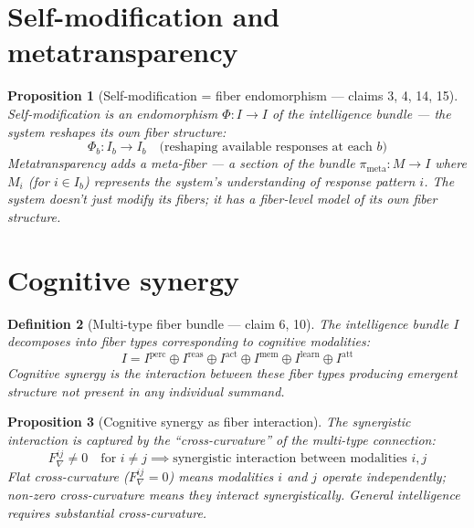 \documentclass[11pt,a4paper]{article}
\newtheorem{definition}{Definition}[section]
\newtheorem{proposition}[definition]{Proposition}
\begin{document}
\section{Self-modification and metatransparency}

\begin{proposition}[Self-modification = fiber endomorphism --- claims 3, 4, 14, 15]
\label{prop:selfmod}
Self-modification is an endomorphism $\Phi: I \to I$ of the intelligence
bundle --- the system reshapes its own fiber structure:
\[
  \Phi_b : I_b \to I_b \quad \text{(reshaping available responses at each } b\text{)}
\]
Metatransparency adds a \emph{meta-fiber} --- a section of the bundle
$\pi_{\text{meta}} : M \to I$ where $M_i$ (for $i \in I_b$) represents
the system's understanding of response pattern $i$. The system doesn't
just modify its fibers; it has a fiber-level model of its own fiber structure.
\end{proposition}

\section{Cognitive synergy}

\begin{definition}[Multi-type fiber bundle --- claim 6, 10]
The intelligence bundle $I$ decomposes into fiber types corresponding to
cognitive modalities:
\[
  I = I^{\text{perc}} \oplus I^{\text{reas}} \oplus I^{\text{act}}
    \oplus I^{\text{mem}} \oplus I^{\text{learn}} \oplus I^{\text{att}}
\]
Cognitive synergy is the interaction between these fiber types producing
emergent structure not present in any individual summand.
\end{definition}

\begin{proposition}[Cognitive synergy as fiber interaction]
The synergistic interaction is captured by the ``cross-curvature'' of the
multi-type connection:
\[
  F_\nabla^{ij} \neq 0 \quad \text{for } i \neq j
  \implies \text{synergistic interaction between modalities } i, j
\]
Flat cross-curvature ($F_\nabla^{ij} = 0$) means modalities $i$ and $j$
operate independently; non-zero cross-curvature means they interact
synergistically. General intelligence requires substantial cross-curvature.
\end{proposition}


\end{document}

